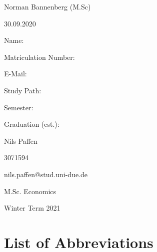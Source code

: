 \documentclass[12pt,a4paper]{article}
\begin{document}
\begin{titlepage}
  \noindent\begin{minipage}[t]{0.3\textwidth}
  \end{minipage}
  \begin{minipage}[t]{0.7\textwidth}
  \hspace{1cm}Norman Bannenberg (M.Sc)
  \end{minipage}

  \noindent\begin{minipage}[t]{0.3\textwidth}
  \end{minipage}
  \begin{minipage}[t]{0.7\textwidth}
  \hspace{1cm}30.09.2020
  \end{minipage}

  \hrulefill

  \begin{multicols}{3}

  Name:

  Matriculation Number:

  E-Mail:

  Study Path:

  Semester:

  Graduation (est.):
 
 
  \columnbreak

  Nils Paffen

  3071594
  
  nils.paffen@stud.uni-due.de

  M.Sc. Economics


  Winter Term 2021

	\end{multicols}

\end{titlepage}



{
\hypersetup{linkcolor=black}

\setcounter{tocdepth}{3}
\tableofcontents
}

\newpage
\listoffigures
{}

\listoftables
{}

\section*{List of Abbreviations}
\end{document}
